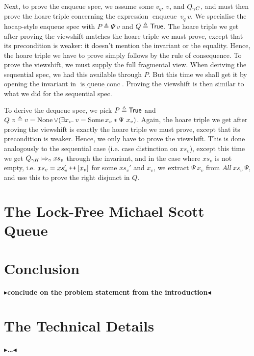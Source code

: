\documentclass[twoside,11pt,openright]{report}
\newcommand{\enqueue}{\operatorname{enqueue}}
\newcommand{\isqueueconc}{\operatorname{is\_queue\_conc}}
\newcommand\catenate{\mathbin{\text{\ttfamily\upshape ++}}}
\newcommand{\abstractstatefullfrag}[2]{#1 \Mapsto_{\circ} #2}
\newcommand{\todo}[1]{{\color[rgb]{.5,0,0}\textbf{$\blacktriangleright$#1$\blacktriangleleft$}}}
\begin{document}
Next, to prove the enqueue spec, we assume some $v_q$, $v$, and $Q_{\gamma C}$, and must then prove the hoare triple concerning the expression $\enqueue\ v_q\ v$. We specialise the hocap-style enqueue spec with $P \triangleq \Psi \ v$ and $Q \triangleq \textsf{True}$. The hoare triple we get after proving the viewshift matches the hoare triple we must prove, except that its precondition is weaker: it doesn't mention the invariant or the equality. Hence, the hoare triple we have to prove simply follows by the rule of consequence.
To prove the viewshift, we must supply the full fragmental view. When deriving the sequential spec, we had this available through $P$. But this time we shall get it by opening the invariant in $\isqueueconc$. Proving the viewshift is then similar to what we did for the sequential spec.

To derive the dequeue spec, we pick $P \triangleq \textsf{True}$ and $Q \ v \triangleq v = \None \lor (\Exists x_v . v = \Some{x_v} \ast \Psi \ x_v)$. Again, the hoare triple we get after proving the viewshift is exactly the hoare triple we must prove, except that its precondition is weaker. Hence, we only have to prove the viewshift. This is done analogously to the sequential case (i.e. case distinction on $xs_v$), except this time we get $\abstractstatefullfrag{Q_{\gname H}}{xs_v}$ through the invariant, and in the case where $xs_v$ is not empty, i.e. $xs_v = xs_v' \catenate [x_v]$ for some $xs_v'$ and $x_v$, we extract $\Psi \ x_v$ from $All\ xs_v \ \Psi$, and use this to prove the right disjunct in $Q$.


\chapter{The Lock-Free Michael Scott Queue}



\chapter{Conclusion}
\label{ch:conclusion}

\todo{conclude on the problem statement from the introduction}


\cleardoublepage
{}
 



\cleardoublepage
\appendix
\chapter{The Technical Details}

\todo{\dots}
\end{document}
